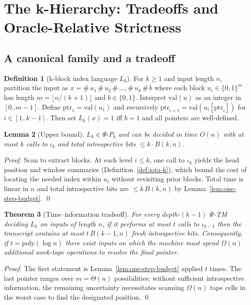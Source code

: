 \documentclass[11pt]{article}
\newtheorem{theorem}{Theorem}[section]
\newtheorem{lemma}[theorem]{Lemma}
\theoremstyle{definition}
\newtheorem{definition}[theorem]{Definition}
\newcommand{\PSi}{\Psi}
\newcommand{\PsiPk}{\PSi\text{-}P_k}
\newcommand{\bits}{\{0,1\}}
\begin{document}
\section{The k-Hierarchy: Tradeoffs and Oracle-Relative Strictness}

\subsection{A canonical family and a tradeoff}

\begin{definition}[k-block index language $L_k$]
\label{def:Lk}
For $k\ge1$ and input length $n$, partition the input as $x=\#\,u_1\,\#\,u_2\,\#\,\ldots,\#\,u_k\,\#\,b$ where each block $u_i\in\bits^{m}$ has length $m=\lfloor n/(k{+}1)\rfloor$ and $b\in\bits$. Interpret $\mathrm{val}(u)$ as an integer in $[0..m{-}1]$. Define $\mathrm{ptr}_1=\mathrm{val}(u_1)$ and recursively $\mathrm{ptr}_{i+1}=\mathrm{val}(u_{i}[\mathrm{ptr}_i])$ for $i\in[1..k{-}1]$. Then set $L_k(x)=1$ iff $b=1$ and all pointers are well-defined.
\end{definition}

\begin{lemma}[Upper bound]
\label{lem:Lk-upper}
$L_k\in \PsiPk$ and can be decided in time $O(n)$ with at most $k$ calls to $\iota_k$ and total introspective bits $\le k\cdot B(k,n)$.
\end{lemma}
\begin{proof}
Scan to extract blocks. At each level $i\le k$, one call to $\iota_k$ yields the head position and window summaries (Definition~\ref{def:iota-k}), which bound the cost of locating the needed index within $u_i$ without revisiting prior blocks. Total time is linear in $n$ and total introspective bits are $\le k\,B(k,n)$ by Lemma~\ref{lem:one-step-budget}. \qed
\end{proof}

\begin{theorem}[Time--information tradeoff]
\label{thm:tradeoff}
For every depth-$(k{-}1)$ $\PSi$-TM deciding $L_k$ on inputs of length $n$, if it performs at most $t$ calls to $\iota_{k-1}$ then the transcript contains at most $t\,B(k{-}1,n)$ fresh introspective bits. Consequently, if $t=\mathrm{poly}(\log n)$ there exist inputs on which the machine must spend $\Omega(n)$ additional work-tape operations to resolve the final pointer.
\end{theorem}
\begin{proof}
The first statement is Lemma~\ref{lem:one-step-budget} applied $t$ times. The last pointer ranges over $m=\Theta(n)$ possibilities; without sufficient introspective information, the remaining uncertainty necessitates scanning $\Omega(n)$ tape cells in the worst case to find the designated position. \qed
\end{proof}
\end{document}
